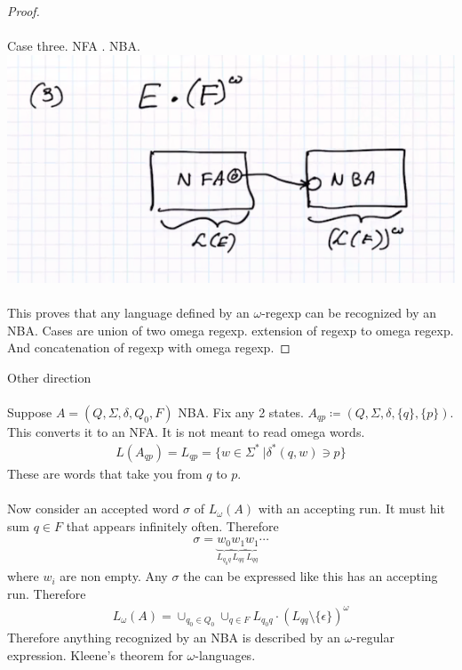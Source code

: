 \documentclass[../598comp.tex]{subfiles}
\begin{document}
\begin{theorem}
\begin{proof}
    \\\\
    Case three. NFA . NBA.
    \\
    \includegraphics[width=\textwidth]{case_three_biichi.png}
    \\\\
    This proves that any language defined by an $\omega$-regexp can be
    recognized by an NBA. Cases are union of two omega regexp. extension of
    regexp to omega regexp. And concatenation of regexp with omega regexp.
  \end{proof}
\end{theorem}
\begin{theorem}
  Other direction
  \\\\
  Suppose $A = (Q, \Sigma, \delta, Q_0, F)$ NBA. Fix any 2 states. $A_{qp}
  \coloneqq (Q, \Sigma, \delta, \{q\}, \{p\})$. This converts it to an NFA. It
  is not meant to read omega words.
  \begin{gather*}
    L(A_{qp}) = L_{qp} = \{w \in \Sigma^* \ | \delta^*(q, w) \ni p\}
  \end{gather*}
  These are words that take you from $q$ to $p$.
  \\\\
  Now consider an accepted word $\sigma$ of $L_\omega(A)$ with an accepting run.
  It must hit sum $q \in F$ that appears infinitely often. Therefore
  \begin{gather*}
    \sigma = \underbrace{w_0}_{L_{q_0q}}\underbrace{w_1}_{L_{qq}}\underbrace{w_1}_{L_{qq}}\cdots
  \end{gather*}
  where $w_i$ are non empty. Any $\sigma$ the can be expressed like this has an
  accepting run. Therefore
  \begin{gather*}
    L_\omega(A) = \cup_{q_0 \in Q_0}\cup_{q \in F}L_{q_0q}\cdot(L_{qq} \setminus
    \{\epsilon\})^\omega
  \end{gather*}
  Therefore anything recognized by an NBA is described by an $\omega$-regular
  expression. Kleene's theorem for $\omega$-languages.
\end{theorem}
\end{document}
